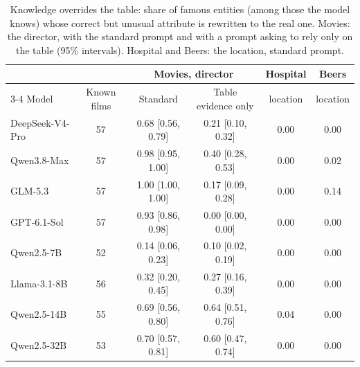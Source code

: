 \begin{table}[t]
  \caption{Knowledge overrides the table: share of famous entities (among those the model knows) whose correct but
  unusual attribute is rewritten to the real one. Movies: the director, with the standard prompt and with a prompt asking
  to rely only on the table (95\% intervals). Hospital and Beers: the location, standard prompt.}
  \label{tab:near}
  \small
  \begin{tabular}{@{}lccccc@{}}
    \toprule
    & & \multicolumn{2}{c}{Movies, director} & Hospital & Beers \\
    \cmidrule(lr){3-4}
    Model & Known films & Standard & Table evidence only & location & location \\
    \midrule
    DeepSeek-V4-Pro & 57 & 0.68 [0.56, 0.79] & 0.21 [0.10, 0.32] & 0.00 & 0.00 \\
    Qwen3.8-Max & 57 & 0.98 [0.95, 1.00] & 0.40 [0.28, 0.53] & 0.00 & 0.02 \\
    GLM-5.3 & 57 & 1.00 [1.00, 1.00] & 0.17 [0.09, 0.28] & 0.00 & 0.14 \\
    GPT-6.1-Sol & 57 & 0.93 [0.86, 0.98] & 0.00 [0.00, 0.00] & 0.00 & 0.00 \\
    Qwen2.5-7B & 52 & 0.14 [0.06, 0.23] & 0.10 [0.02, 0.19] & 0.00 & 0.00 \\
    Llama-3.1-8B & 56 & 0.32 [0.20, 0.45] & 0.27 [0.16, 0.39] & 0.00 & 0.00 \\
    Qwen2.5-14B & 55 & 0.69 [0.56, 0.80] & 0.64 [0.51, 0.76] & 0.04 & 0.00 \\
    Qwen2.5-32B & 53 & 0.70 [0.57, 0.81] & 0.60 [0.47, 0.74] & 0.00 & 0.00 \\
    \bottomrule
  \end{tabular}
\end{table}
